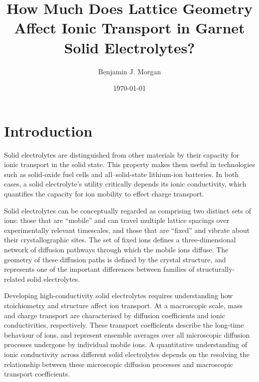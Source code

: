 \documentclass[aps,prb,twocolumn,superscriptaddress,reprint]{revtex4-1}
\begin{document}
\title{How Much Does Lattice Geometry Affect Ionic Transport in Garnet Solid Electrolytes?}
\author{Benjamin J. Morgan}

\date{\today}

\begin{abstract}
\end{abstract}

\maketitle

\section{Introduction}

Solid electrolytes are distinguished from other materials by their capacity for ionic transport in the solid state.
This property makes them useful in technologies such as solid-oxide fuel cells and all--solid-state lithium-ion batteries.
In both cases, a solid electrolyte's utility critically depends its ionic conductivity, which quantifies the capacity for ion mobility to effect charge transport.

Solid electrolytes can be conceptually regarded as comprising two distinct sets of ions: those that are ``mobile'' and can travel multiple lattice spacings over experimentally relevant timescales, and those that are ``fixed'' and vibrate about their crystallographic sites. 
The set of fixed ions defines a three-dimensional network of diffusion pathways through which the mobile ions diffuse. 
The geometry of these diffusion paths is defined by the crystal structure, and represents one of the important differences between families of structurally-related solid electrolytes.

Developing high-conductivity solid electrolytes requires understanding how stoichiometry and structure affect ion transport. 
At a macroscopic scale, mass and charge transport are characterised by diffusion coefficients and ionic conductivities, respectively. 
These transport coefficients describe the long-time behaviour of ions, and represent ensemble averages over all microscopic diffusion processes undergone by individual mobile ions. 
A quantitative understanding of ionic conductivity across different solid electrolytes depends on the resolving the relationship between these microscopic diffusion processes and macroscopic transport coefficients.  
\end{document}
